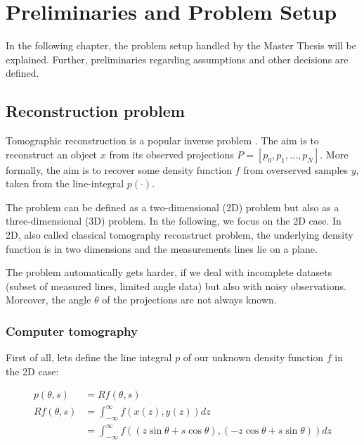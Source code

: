 \chapter{Preliminaries and Problem Setup}
\label{sec:preliminariesProblem}


In the following chapter, the problem setup handled by the Master Thesis will be explained.
Further, preliminaries regarding assumptions and other decisions are defined.

\section{Reconstruction problem}
Tomographic reconstruction is a popular inverse problem \cite{tomographicReconstruction}. 
The aim is to reconstruct an object $x$ from its observed projections $P=[p_0, p_1, \dots, p_N]$.
More formally, the aim is to recover some density function $f$ from overserved samples $y$, taken from the line-integral $p(\cdot)$.

The problem can be defined as a two-dimensional (2D) problem but also as a three-dimensional (3D) problem. In the following, we focus on the 2D case.
In 2D, also called classical tomography reconstruct problem, the underlying density function is in two dimensions and the measurements lines lie on a plane.

The problem automatically gets harder, if we deal with incomplete datasets (subset of measured lines, limited angle data) but also with noisy observations.
Moreover, the angle $\theta$ of the projections are not always known.

\subsection{Computer tomography}

First of all, lets define the line integral $p$ of our unknown density function $f$ in the 2D case:

\begin{equation}
    \begin{aligned}
        p(\theta, s)   &=  R f(\theta, s) \\
        R f(\theta, s) &=  \int_{-\infty}^{\infty} f(x(z), y(z)) dz \\
                       &= \int_{-\infty}^{\infty} f((z \sin \theta + s \cos \theta), (-z \cos \theta + s \sin \theta)) dz \\
    \end{aligned}
\end{equation}

